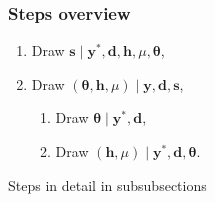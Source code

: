 \subsubsection{Steps overview}

\begin{enumerate}
	\item Draw $\bm{s}\mid\bm{y}^\ast,\bm{d},\bm{h},\mu,\bm\theta$,
	\item Draw $(\bm\theta,\bm h,\mu)\mid\bm y,\bm d,\bm s$,
	\begin{enumerate}
		\item Draw $\bm\theta\mid\bm{y}^\ast,\bm{d}$,
		\item Draw $(\bm{h},\mu)\mid\bm{y}^\ast,\bm{d},\bm\theta$.
	\end{enumerate}
\end{enumerate}

Steps in detail in subsubsections
